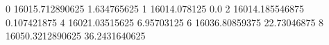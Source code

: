 0 16015.712890625 1.634765625
1 16014.078125 0.0
2 16014.185546875 0.107421875
4 16021.03515625 6.95703125
6 16036.80859375 22.73046875
8 16050.3212890625 36.2431640625
